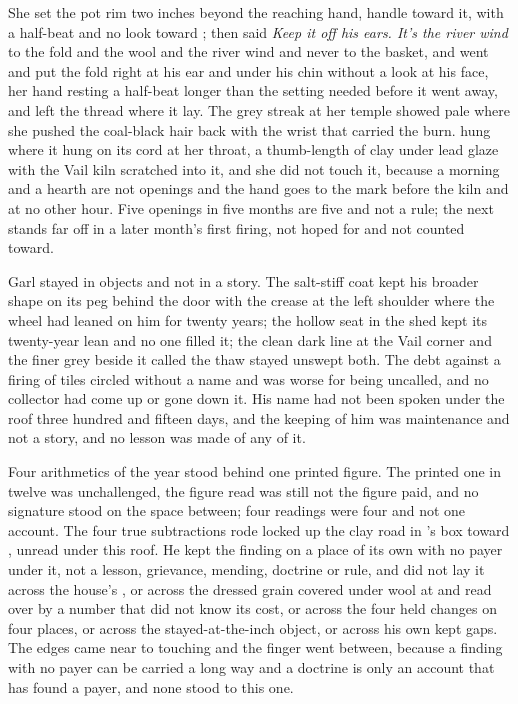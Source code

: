 She set the pot rim two inches beyond the reaching hand, handle toward it, with a half-beat and no look toward ; then said \emph{Keep it off his ears. It's the river wind} to the fold and the wool and the river wind and never to the basket, and went and put the fold right at his ear and under his chin without a look at his face, her hand resting a half-beat longer than the setting needed before it went away, and left the thread where it lay. The grey streak at her temple showed pale where she pushed the coal-black hair back with the wrist that carried the burn.  hung where it hung on its cord at her throat, a thumb-length of clay under lead glaze with the Vail kiln scratched into it, and she did not touch it, because a morning and a hearth are not openings and the hand goes to the mark before the kiln and at no other hour. Five openings in five months are five and not a rule; the next stands far off in a later month's first firing, not hoped for and not counted toward.

Garl stayed in objects and not in a story. The salt-stiff coat kept his broader shape on its peg behind the door with the crease at the left shoulder where the wheel had leaned on him for twenty years; the hollow seat in the shed kept its twenty-year lean and no one filled it; the clean dark line at the Vail corner and the finer grey beside it called the thaw stayed unswept both. The debt against a firing of tiles circled without a name and was worse for being uncalled, and no collector had come up  or gone down it. His name had not been spoken under the roof three hundred and fifteen days, and the keeping of him was maintenance and not a story, and no lesson was made of any of it.

\scenebreak

Four arithmetics of the year stood behind one printed figure. The printed one in twelve was unchallenged, the figure read was still not the figure paid, and no signature stood on the space between; four readings were four and not one account. The four true subtractions rode locked up the clay road in 's box toward , unread under this roof. He kept the finding on a place of its own with no payer under it, not a lesson, grievance, mending, doctrine or rule, and did not lay it across the house's , or across the dressed grain covered under wool at  and read over by a number that did not know its cost, or across the four held changes on four places, or across the stayed-at-the-inch object, or across his own kept gaps. The edges came near to touching and the finger went between, because a finding with no payer can be carried a long way and a doctrine is only an account that has found a payer, and none stood to this one.

